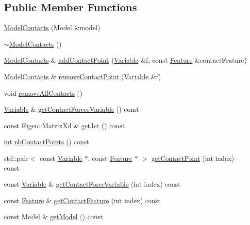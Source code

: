 \subsection*{Public Member Functions}
\begin{DoxyCompactItemize}
\item 
\hyperlink{classocra_1_1ModelContacts_abf9089d7762205480b46005544883e60}{Model\+Contacts} (Model \&model)
\item 
\hyperlink{classocra_1_1ModelContacts_ab8ca6e653ccacdff73ae10e7c0750bbf}{$\sim$\+Model\+Contacts} ()
\item 
\hyperlink{classocra_1_1ModelContacts}{Model\+Contacts} \& \hyperlink{classocra_1_1ModelContacts_a209ae06f99698291a84e043fa7b8e32e}{add\+Contact\+Point} (\hyperlink{classocra_1_1Variable}{Variable} \&f, const \hyperlink{classocra_1_1Feature}{Feature} \&contact\+Feature)
\item 
\hyperlink{classocra_1_1ModelContacts}{Model\+Contacts} \& \hyperlink{classocra_1_1ModelContacts_a4e2267a563e01c78c9aff1fced5cb83b}{remove\+Contact\+Point} (\hyperlink{classocra_1_1Variable}{Variable} \&f)
\item 
void \hyperlink{classocra_1_1ModelContacts_ad633a3df5915ee16b3a55b8169e4006e}{remove\+All\+Contacts} ()
\item 
\hyperlink{classocra_1_1Variable}{Variable} \& \hyperlink{classocra_1_1ModelContacts_a6668bfd6c112b849536b701cd2d1097c}{get\+Contact\+Forces\+Variable} () const
\item 
const Eigen\+::\+Matrix\+Xd \& \hyperlink{classocra_1_1ModelContacts_ac3c23337fdfac47ddf40b7e3332e31fc}{get\+Jct} () const
\item 
int \hyperlink{classocra_1_1ModelContacts_ab06a70136062c53c28344ce471f0bd73}{nb\+Contact\+Points} () const
\item 
std\+::pair$<$ const \hyperlink{classocra_1_1Variable}{Variable} $\ast$, const \hyperlink{classocra_1_1Feature}{Feature} $\ast$ $>$ \hyperlink{classocra_1_1ModelContacts_a6fde5f06051fafaebd07a1ebb80bd82c}{get\+Contact\+Point} (int index) const
\item 
const \hyperlink{classocra_1_1Variable}{Variable} \& \hyperlink{classocra_1_1ModelContacts_aede709082b66b0c30aa57ac4cd7094ad}{get\+Contact\+Force\+Variable} (int index) const
\item 
const \hyperlink{classocra_1_1Feature}{Feature} \& \hyperlink{classocra_1_1ModelContacts_a40f66a2528a3f7c0538172987de7c919}{get\+Contact\+Feature} (int index) const
\item 
const Model \& \hyperlink{classocra_1_1ModelContacts_a188e822de7692fba999836b1ffb7f376}{get\+Model} () const
\end{DoxyCompactItemize}

